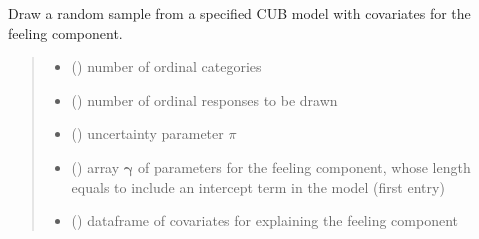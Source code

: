 \documentclass[letterpaper,10pt,english]{sphinxmanual}
\begin{document}

\begin{fulllineitems}
\label{\detokenize{cubmods:cubmods.cub_0w.draw}}
\pysigstartsignatures
{}
\pysigstopsignatures
\sphinxAtStartPar
Draw a random sample from a specified CUB model with covariates for
the feeling component.
\begin{quote}\begin{description}
\begin{itemize}
\item {} 
\sphinxAtStartPar
{} () \textendash{} number of ordinal categories

\item {} 
\sphinxAtStartPar
{} () \textendash{} number of ordinal responses to be drawn

\item {} 
\sphinxAtStartPar
{} () \textendash{} uncertainty parameter \(\pi\)

\item {} 
\sphinxAtStartPar
{} () \textendash{} array \(\pmb \gamma\) of parameters for the feeling component, whose length equals 
 to include an intercept term in the model (first entry)

\item {} 
\sphinxAtStartPar
{} () \textendash{} dataframe of covariates for explaining the feeling component


\end{itemize}
\end{description}
\end{quote}
\end{fulllineitems}
\end{document}
